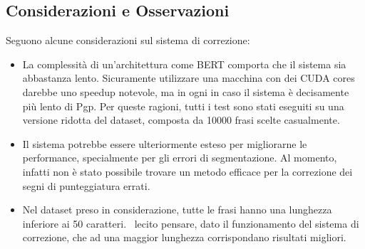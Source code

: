 \documentclass[12pt]{article}
\begin{document}
\subsection{Considerazioni e Osservazioni}
Seguono alcune considerazioni sul sistema di correzione:
\begin{itemize}
\item La complessità di un'architettura come BERT comporta che il sistema sia abbastanza lento. Sicuramente utilizzare una macchina con dei CUDA cores darebbe uno speedup notevole, ma in ogni in caso il sistema è decisamente più lento di Pgp. Per queste ragioni, tutti i test sono stati eseguiti su una versione ridotta del dataset, composta da 10000 frasi scelte casualmente.
\item Il sistema potrebbe essere ulteriormente esteso per migliorarne le performance, specialmente per gli errori di segmentazione. Al momento, infatti non è stato possibile trovare un metodo efficace per la correzione dei segni di punteggiatura errati.
\item Nel dataset preso in considerazione, tutte le frasi hanno una lunghezza inferiore ai 50 caratteri. \E\ lecito pensare, dato il funzionamento del sistema di correzione, che ad una maggior lunghezza corrispondano risultati migliori.
\end{itemize}




\end{document}
